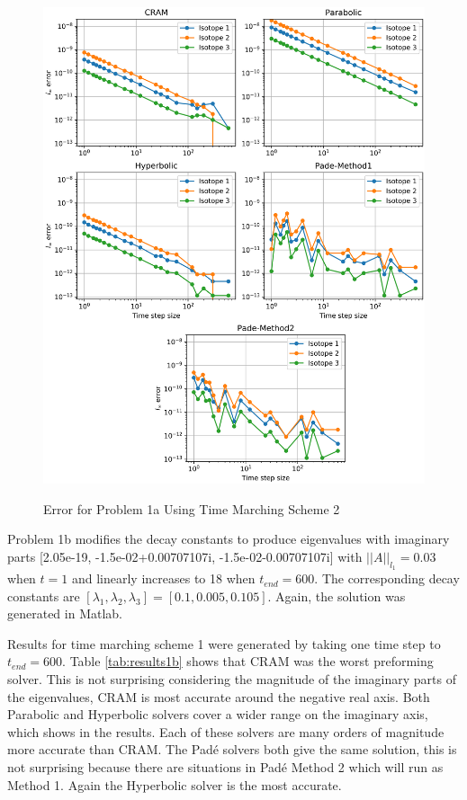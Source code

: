 \begin{figure}[t]
  \centering
  \includegraphics[width=6.5in]{images/problem1aMethod2.png}\\
  \caption{Error for Problem 1a Using Time Marching Scheme 2}
  \label{fig:errorProblem1aTimeMarchingScheme2}
\end{figure} 

\FloatBarrier



Problem 1b modifies the decay constants to produce eigenvalues with imaginary parts [2.05e-19, -1.5e-02+0.00707107i, -1.5e-02-0.00707107i] with $||A||_{l_{1}} = 0.03$ when $t=1$ and linearly increases to 18 when $t_{end} = 600.$ The corresponding decay constants are $[\lambda_{1}, \lambda_{2}, \lambda_{3}] = [0.1, 0.005, 0.105]$. Again, the solution was generated in Matlab. 

Results for time marching scheme 1 were generated by taking one time step to $t_{end} = 600$. Table \ref{tab:results1b} shows that CRAM was the worst preforming solver. This is not surprising considering the magnitude of the imaginary parts of the eigenvalues, CRAM is most accurate around the negative real axis. Both Parabolic and Hyperbolic solvers cover a wider range on the imaginary axis, which shows in the results. Each of these solvers are many orders of magnitude more accurate than CRAM. The Pad\'e solvers both give the same solution, this is not surprising because there are situations in Pad\'e Method 2 which will run as Method 1. Again the Hyperbolic solver is the most accurate.

